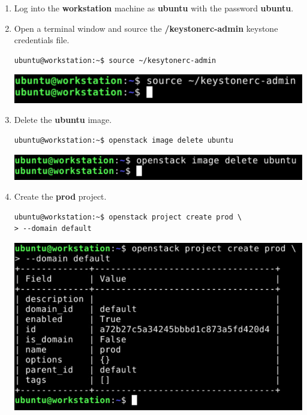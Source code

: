 \documentclass[letterpaper, 12pt]{article}
\begin{document}
\begin{enumerate}
    \item Log into the \textbf{workstation} machine as \textbf{ubuntu} with the password \textbf{ubuntu}.

    \item Open a terminal window and source the \textbf{\texttildemid/keystonerc-admin} keystone credentials file.
\begin{lstlisting}
ubuntu@workstation:~$ source ~/kesytonerc-admin
\end{lstlisting}

    \begin{center}
        \includegraphics[width=\linewidth]{images/part1/step2.png}
    \end{center}

    \item Delete the \textbf{ubuntu} image.
\begin{lstlisting}
ubuntu@workstation:~$ openstack image delete ubuntu
\end{lstlisting}

\begin{center}
    \includegraphics[width=\linewidth]{images/part1/step3.png}
\end{center}

    \item Create the \textbf{prod} project.
\begin{lstlisting}
ubuntu@workstation:~$ openstack project create prod \
> --domain default
\end{lstlisting}

    \begin{center}
        \includegraphics[width=\linewidth]{images/part1/step4.png}
    \end{center}


\end{enumerate}
\end{document}

